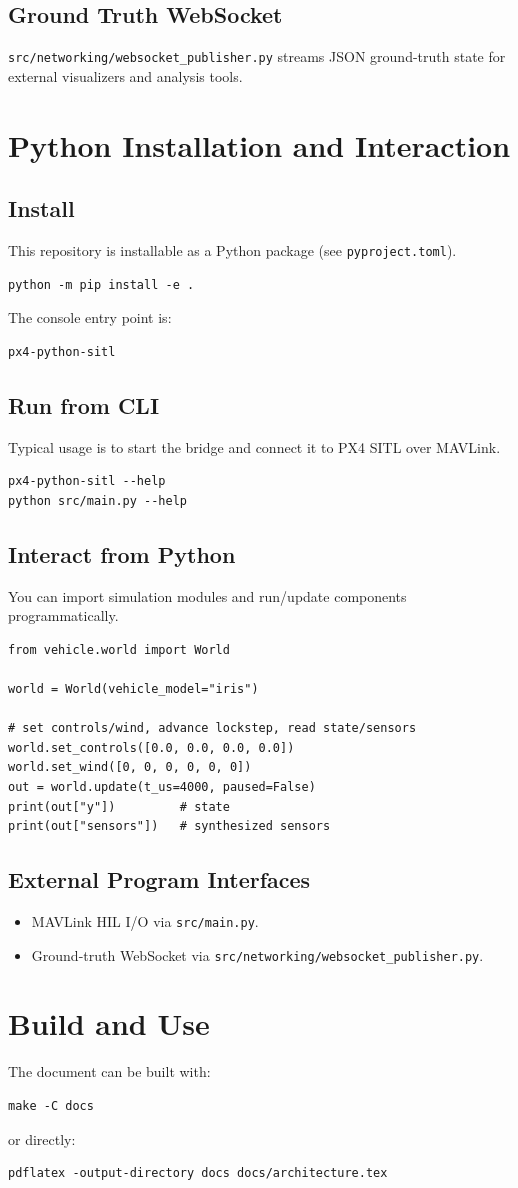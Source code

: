 \documentclass[11pt,a4paper]{article}
\begin{document}
\subsection{Ground Truth WebSocket}
\texttt{src/networking/websocket_publisher.py} streams JSON ground-truth state for external visualizers and analysis tools.

\section{Python Installation and Interaction}
\subsection{Install}
This repository is installable as a Python package (see \texttt{pyproject.toml}).
\begin{verbatim}
python -m pip install -e .
\end{verbatim}
The console entry point is:
\begin{verbatim}
px4-python-sitl
\end{verbatim}

\subsection{Run from CLI}
Typical usage is to start the bridge and connect it to PX4 SITL over MAVLink.
\begin{verbatim}
px4-python-sitl --help
python src/main.py --help
\end{verbatim}
\subsection{Interact from Python}
You can import simulation modules and run/update components programmatically.
\begin{verbatim}
from vehicle.world import World

world = World(vehicle_model="iris")

# set controls/wind, advance lockstep, read state/sensors
world.set_controls([0.0, 0.0, 0.0, 0.0])
world.set_wind([0, 0, 0, 0, 0, 0])
out = world.update(t_us=4000, paused=False)
print(out["y"])         # state
print(out["sensors"])   # synthesized sensors
\end{verbatim}

\subsection{External Program Interfaces}
\begin{itemize}
    \item MAVLink HIL I/O via \texttt{src/main.py}.
    \item Ground-truth WebSocket via \texttt{src/networking/websocket_publisher.py}.
\end{itemize}

\section{Build and Use}
The document can be built with:
\begin{verbatim}
make -C docs
\end{verbatim}
or directly:
\begin{verbatim}
pdflatex -output-directory docs docs/architecture.tex
\end{verbatim}
\end{document}
